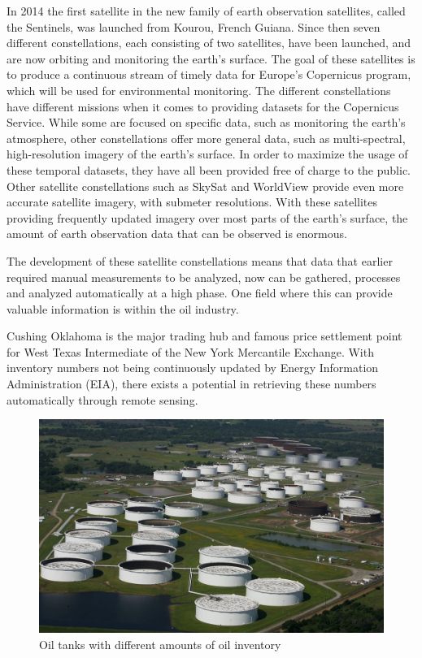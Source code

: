 In 2014 the first satellite in the new family of earth observation satellites, called the Sentinels, was launched from Kourou, French Guiana. Since then seven different constellations, each consisting of two satellites,  have been launched, and are now orbiting and monitoring the earth's surface. The goal of these satellites is to produce a continuous stream of timely data for Europe's Copernicus program, which will be used for environmental monitoring. The different constellations have different missions when it comes to providing datasets for the Copernicus Service. While some are focused on specific data, such as monitoring the earth's atmosphere, other constellations offer more general data, such as multi-spectral, high-resolution imagery of the earth's surface. In order to maximize the usage of these temporal datasets, they have all been provided free of charge to the public. Other satellite constellations such as SkySat \citep{Planet2017} and WorldView \citep{DigitalGlobe2017} provide even more accurate satellite imagery, with submeter resolutions. With these satellites providing frequently updated imagery over most parts of the earth's surface, the amount of earth observation data that can be observed is enormous. 

The development of these satellite constellations means that data that earlier required manual measurements to be analyzed, now can be gathered, processes and analyzed automatically at a high phase. One field where this can provide valuable information is within the oil industry.

Cushing Oklahoma is the major trading hub and famous price settlement point for West Texas Intermediate of the New York Mercantile Exchange. With inventory numbers not being continuously updated by Energy Information Administration (EIA), there exists a potential in retrieving these numbers automatically through remote sensing.

\begin{figure}[!h]
	\centering
	\includegraphics{fig/cushing_oklahoma.jpg}
	\caption{Oil tanks with different amounts of oil inventory}
	\label{fig:cushingoklahoma}
\end{figure}

